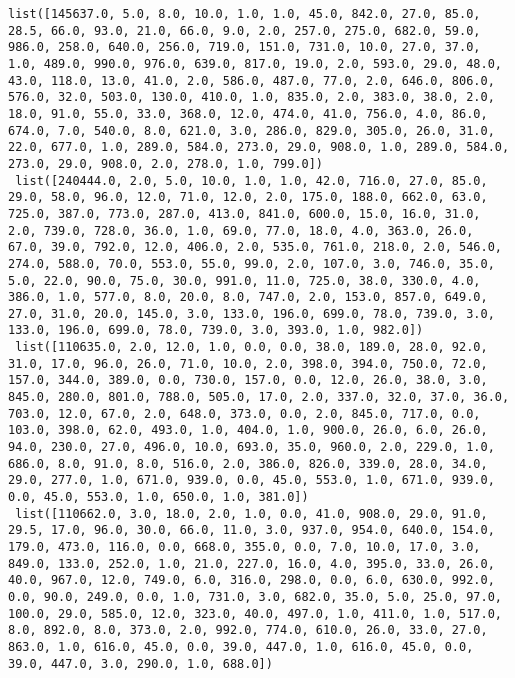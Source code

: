 \documentclass[11pt]{article}
\begin{document}
\begin{Verbatim}[commandchars=\\\{\}]
 list([145637.0, 5.0, 8.0, 10.0, 1.0, 1.0, 45.0, 842.0, 27.0, 85.0, 28.5, 66.0, 93.0, 21.0, 66.0, 9.0, 2.0, 257.0, 275.0, 682.0, 59.0, 986.0, 258.0, 640.0, 256.0, 719.0, 151.0, 731.0, 10.0, 27.0, 37.0, 1.0, 489.0, 990.0, 976.0, 639.0, 817.0, 19.0, 2.0, 593.0, 29.0, 48.0, 43.0, 118.0, 13.0, 41.0, 2.0, 586.0, 487.0, 77.0, 2.0, 646.0, 806.0, 576.0, 32.0, 503.0, 130.0, 410.0, 1.0, 835.0, 2.0, 383.0, 38.0, 2.0, 18.0, 91.0, 55.0, 33.0, 368.0, 12.0, 474.0, 41.0, 756.0, 4.0, 86.0, 674.0, 7.0, 540.0, 8.0, 621.0, 3.0, 286.0, 829.0, 305.0, 26.0, 31.0, 22.0, 677.0, 1.0, 289.0, 584.0, 273.0, 29.0, 908.0, 1.0, 289.0, 584.0, 273.0, 29.0, 908.0, 2.0, 278.0, 1.0, 799.0])
 list([240444.0, 2.0, 5.0, 10.0, 1.0, 1.0, 42.0, 716.0, 27.0, 85.0, 29.0, 58.0, 96.0, 12.0, 71.0, 12.0, 2.0, 175.0, 188.0, 662.0, 63.0, 725.0, 387.0, 773.0, 287.0, 413.0, 841.0, 600.0, 15.0, 16.0, 31.0, 2.0, 739.0, 728.0, 36.0, 1.0, 69.0, 77.0, 18.0, 4.0, 363.0, 26.0, 67.0, 39.0, 792.0, 12.0, 406.0, 2.0, 535.0, 761.0, 218.0, 2.0, 546.0, 274.0, 588.0, 70.0, 553.0, 55.0, 99.0, 2.0, 107.0, 3.0, 746.0, 35.0, 5.0, 22.0, 90.0, 75.0, 30.0, 991.0, 11.0, 725.0, 38.0, 330.0, 4.0, 386.0, 1.0, 577.0, 8.0, 20.0, 8.0, 747.0, 2.0, 153.0, 857.0, 649.0, 27.0, 31.0, 20.0, 145.0, 3.0, 133.0, 196.0, 699.0, 78.0, 739.0, 3.0, 133.0, 196.0, 699.0, 78.0, 739.0, 3.0, 393.0, 1.0, 982.0])
 list([110635.0, 2.0, 12.0, 1.0, 0.0, 0.0, 38.0, 189.0, 28.0, 92.0, 31.0, 17.0, 96.0, 26.0, 71.0, 10.0, 2.0, 398.0, 394.0, 750.0, 72.0, 157.0, 344.0, 389.0, 0.0, 730.0, 157.0, 0.0, 12.0, 26.0, 38.0, 3.0, 845.0, 280.0, 801.0, 788.0, 505.0, 17.0, 2.0, 337.0, 32.0, 37.0, 36.0, 703.0, 12.0, 67.0, 2.0, 648.0, 373.0, 0.0, 2.0, 845.0, 717.0, 0.0, 103.0, 398.0, 62.0, 493.0, 1.0, 404.0, 1.0, 900.0, 26.0, 6.0, 26.0, 94.0, 230.0, 27.0, 496.0, 10.0, 693.0, 35.0, 960.0, 2.0, 229.0, 1.0, 686.0, 8.0, 91.0, 8.0, 516.0, 2.0, 386.0, 826.0, 339.0, 28.0, 34.0, 29.0, 277.0, 1.0, 671.0, 939.0, 0.0, 45.0, 553.0, 1.0, 671.0, 939.0, 0.0, 45.0, 553.0, 1.0, 650.0, 1.0, 381.0])
 list([110662.0, 3.0, 18.0, 2.0, 1.0, 0.0, 41.0, 908.0, 29.0, 91.0, 29.5, 17.0, 96.0, 30.0, 66.0, 11.0, 3.0, 937.0, 954.0, 640.0, 154.0, 179.0, 473.0, 116.0, 0.0, 668.0, 355.0, 0.0, 7.0, 10.0, 17.0, 3.0, 849.0, 133.0, 252.0, 1.0, 21.0, 227.0, 16.0, 4.0, 395.0, 33.0, 26.0, 40.0, 967.0, 12.0, 749.0, 6.0, 316.0, 298.0, 0.0, 6.0, 630.0, 992.0, 0.0, 90.0, 249.0, 0.0, 1.0, 731.0, 3.0, 682.0, 35.0, 5.0, 25.0, 97.0, 100.0, 29.0, 585.0, 12.0, 323.0, 40.0, 497.0, 1.0, 411.0, 1.0, 517.0, 8.0, 892.0, 8.0, 373.0, 2.0, 992.0, 774.0, 610.0, 26.0, 33.0, 27.0, 863.0, 1.0, 616.0, 45.0, 0.0, 39.0, 447.0, 1.0, 616.0, 45.0, 0.0, 39.0, 447.0, 3.0, 290.0, 1.0, 688.0])

\end{Verbatim}
\end{document}
